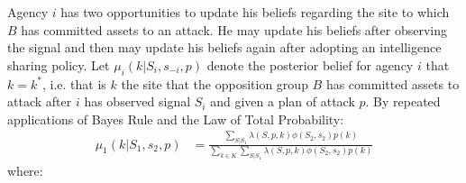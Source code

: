 \documentclass[12pt]{article}
\begin{document}
\vspace{20mm}
\noindent Agency $i$ has two opportunities to update his beliefs regarding the site to which $B$ has committed assets to an attack.  He may update his beliefs after observing the signal and then may update his beliefs again after adopting an intelligence sharing policy.  Let $\mu_i(k|S_i,s_{-i},p)$ denote the posterior belief for agency $i$ that $k=k^*$, i.e. that is $k$ the site that the opposition group $B$ has committed assets to attack after $i$ has observed signal $S_i$ and given a plan of attack $p$.  By repeated applications of Bayes Rule and the Law of Total Probability:
\begin{align*}
\mu_1(k|S_1,s_2,p)&=\frac{\sum_{S|S_1}\lambda(S,p,k)\phi(S_2,s_{2})p(k)}{\sum_{k\in K}\sum_{S|S_1}\lambda(S,p,k)\phi(S_2,s_2)p(k)}
\end{align*}where:
\end{document}
